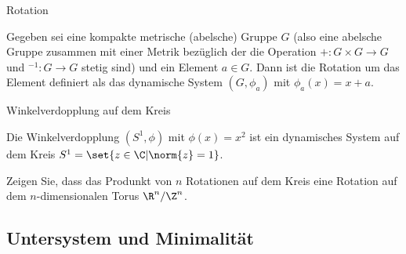 \begin{beispiel} Rotation

  Gegeben sei eine kompakte metrische (abelsche) Gruppe $G$ (also eine abelsche Gruppe zusammen mit einer Metrik bezüglich der die Operation $+: G \times G \to G$ und $^{-1}: G \to G$ stetig sind) und ein Element $a \in G$. Dann ist die Rotation um das Element definiert als das dynamische System $(G, \phi_a)$ mit $\phi_a(x) = x + a$.
\end{beispiel}
\begin{beispiel} Winkelverdopplung auf dem Kreis

  Die Winkelverdopplung $(S^1, \phi)$ mit $\phi(x) = x^2$ ist ein dynamisches System auf dem Kreis $S^1 = \set{z \in \C | \norm{z} = 1}$.
\end{beispiel}
\begin{uebung}
  Zeigen Sie, dass das Produnkt von $n$ Rotationen auf dem Kreis eine Rotation auf dem $n$-dimensionalen Torus $\R^n/\Z^n$.
\end{uebung}

\subsection{Untersystem und Minimalität}

